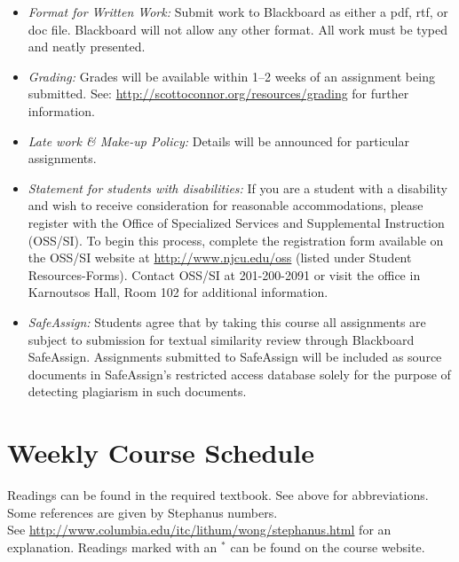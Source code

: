 \documentclass[article,oneside]{memoir}
\begin{document}
\begin{itemize}
\item \textit{Format for Written Work:} Submit work to Blackboard as either a pdf, rtf, or doc file. Blackboard will not allow any other format. All work must be typed and neatly presented. 


\item \textit{Grading:} Grades will be available within 1--2 weeks of an assignment being submitted. See: \href{http://scottoconnor.org/resources/grading}{http://scottoconnor.org/resources/grading} for further information.


\item \textit{Late work \& Make-up Policy:} Details will be announced for particular assignments.

\item \textit{Statement for students with disabilities:} If you are a student
with a disability and wish to receive consideration for reasonable
accommodations, please register with the Office of Specialized Services
and Supplemental Instruction (OSS/SI). To begin this process, complete
the registration form available on the OSS/SI website at
\href{http://www.njcu.edu/oss}{http://www.njcu.edu/oss}
(listed under Student Resources-Forms). Contact OSS/SI at 201-200-2091
or visit the office in Karnoutsos Hall, Room 102 for additional
information.



\item \textit{SafeAssign:} Students agree that by taking this course all assignments are subject to submission for textual similarity review through Blackboard SafeAssign. Assignments submitted to SafeAssign will be included as source documents in SafeAssign's restricted access database solely for the purpose of detecting plagiarism in such documents.  


\end{itemize}





\section{Weekly Course Schedule}
Readings can be found in the required textbook. See above for abbreviations. Some references are given by Stephanus numbers.\\ See \href{http://www.columbia.edu/itc/lithum/wong/stephanus.html}{http://www.columbia.edu/itc/lithum/wong/stephanus.html} for an explanation. Readings marked with an $^{*}$ can be found on the course website.
\end{document}
